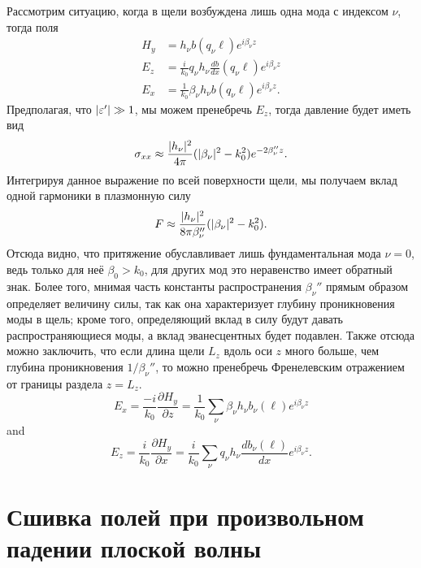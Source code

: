 Рассмотрим ситуацию, когда в щели возбуждена лишь одна мода с индексом $\nu$, тогда поля
\begin{align*}
    H_y &= h_\nu b(q_\nu\ell) e^{i \beta_\nu z}  \\
    E_z &= \frac{i}{k_0} q_\nu h_\nu \frac{db}{dx}(q_\nu\ell) e^{i \beta_\nu z}  \\
    E_x &= \frac{1}{k_0} \beta_\nu h_\nu b(q_\nu\ell) e^{i \beta_\nu z}.
\end{align*}
Предполагая, что $\lvert\varepsilon'\rvert \gg 1$, мы можем пренебречь $E_z$, тогда давление будет иметь вид
\begin{equation}
   \sigma_{xx} \approx \frac{\lvert h_\nu\rvert^2}{4 \pi}(\lvert\beta_\nu\rvert^2 - k_0^2 )e^{-2\beta_\nu'' z}.
\end{equation}
Интегрируя данное выражение по всей поверхности щели, мы получаем вклад одной гармоники в плазмонную силу
\begin{equation}
  F \approx \frac{\lvert h_\nu\rvert^2}{8 \pi \beta_\nu''} (\lvert\beta_\nu\rvert^2 - k_0^2).
\end{equation}
Отсюда видно, что притяжение обуславливает лишь фундаментальная мода $\nu = 0$, ведь только для неё $\beta_0 > k_0$, для других мод это неравенство имеет обратный знак. Более того, мнимая часть константы распространения $\beta_\nu''$ прямым образом определяет величину силы, так как она характеризует глубину проникновения моды в щель; кроме того, определяющий вклад в силу будут давать распространяющиеся моды, а вклад эванесцентных будет подавлен. Также отсюда можно заключить, что если длина щели $L_z$ вдоль оси $z$ много больше, чем глубина проникновения $1/\beta_\nu''$, то можно пренебречь Френелевским отражением от границы раздела $z = L_z$.
\begin{equation*}
E_x = \frac{-i}{k_0}\frac{\partial H_y}{\partial z} = \frac{1}{k_0}\sum_{\nu}\beta_\nu h_\nu b_\nu(\ell) e^{i \beta_\nu z}
\end{equation*}
and 
\begin{equation*}
E_z = \frac{i}{k_0}\frac{\partial H_y}{\partial x} = \frac{i}{k_0}\sum_{\nu} q_\nu h_\nu  \frac{d b_\nu(\ell)}{d x} e^{i \beta_\nu z}.
\end{equation*}

\section{Сшивка полей при произвольном падении плоской волны}

